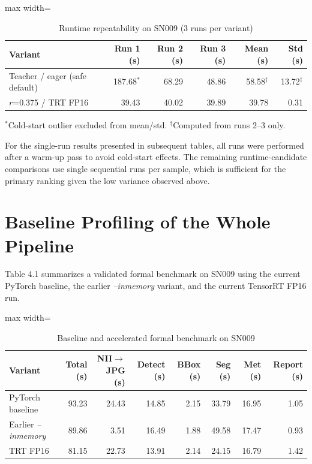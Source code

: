 \begin{table}[H]
\centering
\caption{Runtime repeatability on SN009 (3 runs per variant)}
\label{tab:repeatability}
\begin{adjustbox}{max width=\textwidth}
\renewcommand{\arraystretch}{1.15}
\begin{tabular}{l | rrr | rr}
\toprule
\textbf{Variant} & \textbf{Run 1 (s)} & \textbf{Run 2 (s)} & \textbf{Run 3 (s)} & \textbf{Mean (s)} & \textbf{Std (s)} \\
\midrule
Teacher / eager (safe default)    & 187.68$^*$ & 68.29 & 48.86 & 58.58$^\dagger$ & 13.72$^\dagger$ \\
$r$=0.375 / TRT FP16              & 39.43      & 40.02 & 39.89 & 39.78           & 0.31 \\
\bottomrule
\end{tabular}
\end{adjustbox}

\smallskip
{\footnotesize $^*$Cold-start outlier excluded from mean/std. $^\dagger$Computed from runs 2--3 only.}
\end{table}

For the single-run results presented in subsequent tables, all runs were
performed after a warm-up pass to avoid cold-start effects. The
remaining runtime-candidate comparisons use single sequential runs per
sample, which is sufficient for the primary ranking given the low
variance observed above.

\hypertarget{baseline-profiling-of-the-whole-pipeline}{%
\section{Baseline Profiling of the Whole
Pipeline}\label{baseline-profiling-of-the-whole-pipeline}}

Table 4.1 summarizes a validated formal benchmark on SN009
using the current PyTorch baseline, the earlier \emph{--inmemory}
variant, and the current TensorRT FP16 run.

\begin{table}[H]
\centering
\caption{Baseline and accelerated formal benchmark on SN009}
\label{tab:baseline-sn009}
\begin{adjustbox}{max width=\textwidth}
\renewcommand{\arraystretch}{1.15}
\begin{tabular}{l rrrrrrr}
\toprule
\textbf{Variant} & \textbf{Total (s)} & \textbf{NII$\to$JPG (s)} & \textbf{Detect (s)} & \textbf{BBox (s)} & \textbf{Seg (s)} & \textbf{Met (s)} & \textbf{Report (s)} \\
\midrule
PyTorch baseline          & 93.23 & 24.43 & 14.85 & 2.15 & 33.79 & 16.95 & 1.05 \\
Earlier \emph{--inmemory} & 89.86 &  3.51 & 16.49 & 1.88 & 49.58 & 17.47 & 0.93 \\
TRT FP16                  & 81.15 & 22.73 & 13.91 & 2.14 & 24.15 & 16.79 & 1.42 \\
\bottomrule
\end{tabular}
\end{adjustbox}
\end{table}

